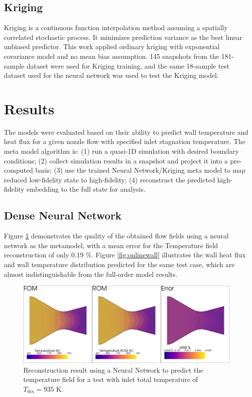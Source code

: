 \documentclass[10pt,fleqn,a4paper,twoside]{article}
\begin{document}
\subsection{Kriging}

Kriging\cite{Forrester2008} is a continuous function interpolation method assuming a spatially correlated stochastic process. It minimizes prediction variance as the best linear unbiased predictor. This work applied ordinary kriging with exponential covariance model and no mean bias assumption. 145 snapshots from the 181-sample dataset were used for Kriging training, and the same 18-sample test dataset used for the neural network was used to test the Kriging model.

\section{Results}

The models were evaluated based on their ability to predict wall temperature and heat flux for a given nozzle flow with specified inlet stagnation temperature. The meta model algorithm is: (1) run a quasi-1D simulation with desired boundary conditions; (2) collect simulation results in a snapshot and project it into a pre-computed basis; (3) use the trained Neural Network/Kriging meta model to map reduced low-fidelity state to high-fidelity; (4) reconstruct the predicted high-fidelity embedding to the full state for analysis.

\subsection{Dense Neural Network}

Figure \ref{fig:onlinetest} demonstrates the quality of the obtained flow fields using a neural network as the metamodel, with a mean error for the Temperature field reconstruction of only 0.19 \%. Figure \ref{fig:onlinewall} illustrates the wall heat flux and wall temperature distribution predicted for the same test case, which are almost indistinguishable from the full-order model results.

\begin{figure}[!ht]
	\begin{center}
		\includegraphics[width=\textwidth]{images/online_test_2d.png}
		\caption{Reconstruction result using a Neural Network to predict the temperature field for a test with inlet total temperature of $T_{0in}=935$ K.}
    \label{fig:onlinetest}
	\end{center}  
\end{figure}
\end{document}
